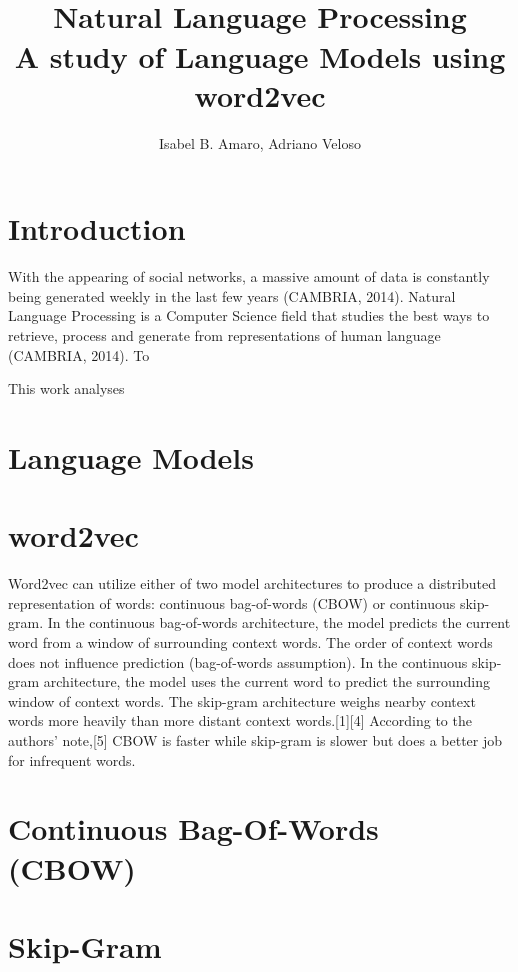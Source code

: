 \documentclass[12pt]{article}
\title{\\ Natural Language Processing\\ A study of Language Models using word2vec}
\author{Isabel B. Amaro\inst{1}, Adriano Veloso\inst{2}}
\begin{document}
 

\maketitle

\begin{abstract}
\end{abstract}

\section{Introduction}

\hspace{6ex} With the appearing of social networks, a massive amount of data is constantly being generated weekly in the last few years (CAMBRIA, 2014). Natural Language Processing is a Computer Science field that studies the best ways to retrieve, process and generate from representations of human language (CAMBRIA, 2014). To

This work analyses 

\section{Language Models}

\section{word2vec}

Word2vec can utilize either of two model architectures to produce a distributed representation of words: continuous bag-of-words (CBOW) or continuous skip-gram. In the continuous bag-of-words architecture, the model predicts the current word from a window of surrounding context words. The order of context words does not influence prediction (bag-of-words assumption). In the continuous skip-gram architecture, the model uses the current word to predict the surrounding window of context words. The skip-gram architecture weighs nearby context words more heavily than more distant context words.[1][4] According to the authors' note,[5] CBOW is faster while skip-gram is slower but does a better job for infrequent words.

\section{Continuous Bag-Of-Words (CBOW)}

\section{Skip-Gram}
\end{document}
